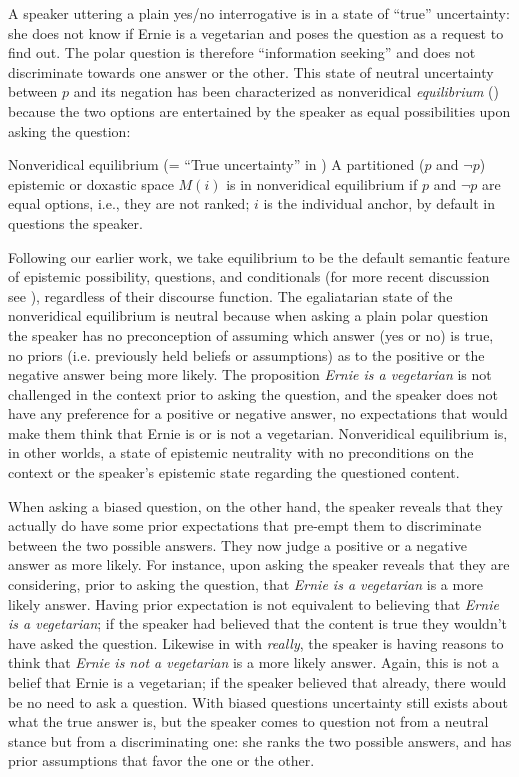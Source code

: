 \documentclass[output=paper,colorlinks,citecolor=brown]{langscibook}
\begin{document}
A speaker uttering a plain yes/no interrogative is in a state of ``true'' uncertainty: she does not know if Ernie is a vegetarian and poses the question as a request to find out. The polar question is therefore ``information seeking'' and does not discriminate towards one answer or the other. This state of  neutral uncertainty between $p$ and its negation has been characterized as nonveridical \textit{equilibrium} (\citealt{giannakidou2013, giannakidoumari2016, giannakidoumari2018a, giannakidoumari2018b, giannakidoumari2021a, giannakidoumari2021b})  because the two options are entertained by the speaker as equal possibilities upon asking the question:

\ea \label{nonveridical} Nonveridical equilibrium (= ``True uncertainty'' in \citealt{giannakidou2013})
\sn A partitioned ($p$ and $\neg p$) epistemic or doxastic space $M(i)$ is in non\-ve\-ri\-di\-cal equilibrium if $p$ and $\neg p$ are equal options, i.e., they are not ranked; $i$ is the individual anchor, by default in questions the speaker. 
\z 


Following our earlier work, we take equilibrium to be the default semantic feature of epistemic possibility, questions, and conditionals (for more recent discussion see \citealt{liu2021}), regardless of their discourse function. The egaliatarian state of the nonveridical equilibrium  is neutral because when asking a plain polar question the speaker has no preconception of assuming which answer (yes or no) is true, no priors (i.e. previously held beliefs or assumptions) as to the positive or the negative answer being more likely. The proposition \textit{Ernie is a vegetarian} is not challenged in the context prior to asking the question, and the speaker does not have any preference for a positive or negative answer, no expectations that would make them think that Ernie is or is not a vegetarian. Nonveridical equilibrium is, in other worlds, a state of epistemic neutrality with no preconditions on the context or the speaker's epistemic state regarding the questioned content. 

When asking a biased question, on the other hand, the speaker reveals that they actually do have some prior expectations  that pre-empt  them to discriminate between the two possible answers. They now judge a positive or a negative answer as more likely.  For instance, upon asking  the speaker reveals that they are considering, prior to asking the question, that \textit{Ernie is a vegetarian} is a more likely answer. Having prior expectation is not equivalent to believing that  \textit{Ernie is a vegetarian}; if the speaker had believed that the content is true they wouldn't have asked the question. Likewise in  with \textit{really}, the speaker is having reasons to think that \textit{Ernie is not a vegetarian} is a more likely answer. Again, this is not a belief that Ernie is a vegetarian; if the speaker believed that already, there would be no need to ask a question. With biased questions uncertainty still exists about what the true answer is, but the speaker comes to question not from a neutral stance but from a discriminating one: she ranks the two possible answers, and has prior assumptions that favor the one or the other.
\end{document}
